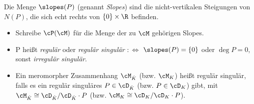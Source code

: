 \begin{defn} %
Die Menge $\slopes(P)$ (genannt \emph{Slopes}) sind die nicht-vertikalen
Steigungen von $N(P)$, die sich echt rechts von $\{0\}\times\R$ befinden.
\begin{itemize}
\item Schreibe $\cP(\cM)$ für die Menge der zu $\cM$ gehörigen Slopes.
\item P heißt \emph{regulär} oder \emph{regulär singulär} $:\Leftrightarrow$
$\slopes(P)=\{0\}$ oder $\deg P=0$, sonst \emph{irregulär singulär}.
\item Ein meromorpher Zusammenhang $\cM_{\hat K}$ (bzw. $\cM_K$) heißt regulär
singulär, falls es ein regulär singuläres $P\in \cD_{\hat K}$ (bzw. $P\in
\cD_K$) gibt, mit $\cM_{\hat K}\cong\cD_{\hat K}/\cD_{\hat K}\cdot P$ (bzw.
$\cM_K\cong\cD_K/\cD_K\cdot P$).
\end{itemize}
\end{defn}

